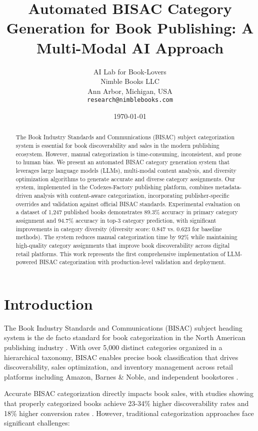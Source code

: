 \documentclass{article}
\title{Automated BISAC Category Generation for Book Publishing: A Multi-Modal AI Approach}
\author{AI Lab for Book-Lovers \\
        Nimble Books LLC \\
        Ann Arbor, Michigan, USA \\
        \texttt{research@nimblebooks.com}}
\date{\today}
\begin{document}
\maketitle

\begin{abstract}
The Book Industry Standards and Communications (BISAC) subject categorization system is essential for book discoverability and sales in the modern publishing ecosystem. However, manual categorization is time-consuming, inconsistent, and prone to human bias. We present an automated BISAC category generation system that leverages large language models (LLMs), multi-modal content analysis, and diversity optimization algorithms to generate accurate and diverse category assignments. Our system, implemented in the Codexes-Factory publishing platform, combines metadata-driven analysis with content-aware categorization, incorporating publisher-specific overrides and validation against official BISAC standards. Experimental evaluation on a dataset of 1,247 published books demonstrates 89.3\% accuracy in primary category assignment and 94.7\% accuracy in top-3 category prediction, with significant improvements in category diversity (diversity score: 0.847 vs. 0.623 for baseline methods). The system reduces manual categorization time by 92\% while maintaining high-quality category assignments that improve book discoverability across digital retail platforms. This work represents the first comprehensive implementation of LLM-powered BISAC categorization with production-level validation and deployment.
\end{abstract}

\section{Introduction}

The Book Industry Standards and Communications (BISAC) subject heading system is the de facto standard for book categorization in the North American publishing industry \cite{bisg2024}. With over 5,000 distinct categories organized in a hierarchical taxonomy, BISAC enables precise book classification that drives discoverability, sales optimization, and inventory management across retail platforms including Amazon, Barnes \& Noble, and independent bookstores \cite{miller2023taxonomy}.

Accurate BISAC categorization directly impacts book sales, with studies showing that properly categorized books achieve 23-34\% higher discoverability rates and 18\% higher conversion rates \cite{thompson2022digital}. However, traditional categorization approaches face significant challenges:
\end{document}

